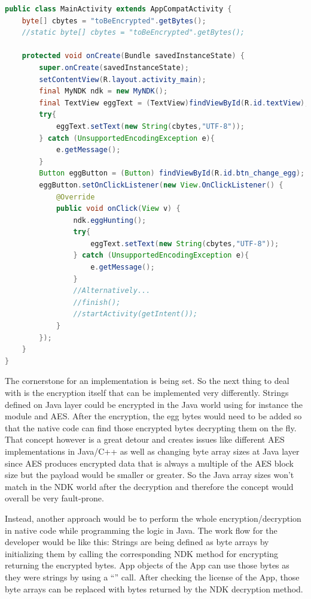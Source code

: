 \begin{lstlisting}[language=Java, caption=Native Code String Change, label=native_string_change]
public class MainActivity extends AppCompatActivity {
    byte[] cbytes = "toBeEncrypted".getBytes();
    //static byte[] cbytes = "toBeEncrypted".getBytes();

    protected void onCreate(Bundle savedInstanceState) {
        super.onCreate(savedInstanceState);
        setContentView(R.layout.activity_main);
        final MyNDK ndk = new MyNDK();
        final TextView eggText = (TextView)findViewById(R.id.textView);
        try{
            eggText.setText(new String(cbytes,"UTF-8"));
        } catch (UnsupportedEncodingException e){
            e.getMessage();
        }
        Button eggButton = (Button) findViewById(R.id.btn_change_egg);
        eggButton.setOnClickListener(new View.OnClickListener() {
            @Override
            public void onClick(View v) {
                ndk.eggHunting();
                try{
                    eggText.setText(new String(cbytes,"UTF-8"));
                } catch (UnsupportedEncodingException e){
                    e.getMessage();
                }
                //Alternatively...
                //finish();
                //startActivity(getIntent());
            }
        });
    }
}
\end{lstlisting}
The cornerstone for an implementation is being set.
So the next thing to deal with is the encryption itself that can be
implemented very differently. Strings defined on Java layer could be
encrypted in the Java world using for instance the 
module and AES. After the encryption, the egg bytes would need to
be added so that the native code can find those encrypted bytes
decrypting them on the fly. That concept however is a great detour and
creates issues like different AES implementations in Java/C++ as well as
changing byte array sizes at Java layer since AES produces encrypted data
that is always a multiple of the AES block size but the payload would be
smaller or greater. So the Java array sizes won't match in the NDK world
after the decryption and therefore the concept would overall be very fault-prone.

Instead, another approach would be to perform the whole encryption/decryption
in native code while programming the logic in Java. The work flow for the developer would be like this: Strings are being defined as byte arrays by initializing them by calling the corresponding NDK method for encrypting
returning the encrypted bytes. App objects of the App can use those bytes
as they were strings by using a ``'' call.
After checking the license of the App, those byte arrays can be replaced
with bytes returned by the NDK decryption method.

